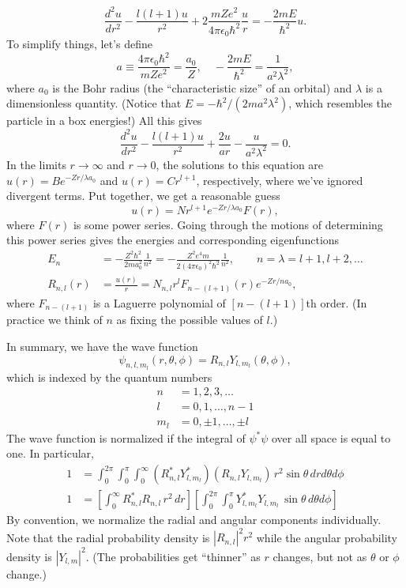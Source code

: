 \documentclass[../p052main.tex]{subfiles}
\begin{document}
\[ \frac{d^2u}{dr^2} - \frac{l(l+1)u}{r^2} + 2 \frac{mZe^2}{4\pi \epsilon_0 \hbar^2} \frac{u}{r} = -\frac{2mE}{\hbar^2}u .\]
To simplify things, let's define
\[ a \equiv \frac{4\pi \epsilon_0 \hbar^2}{mZe^2} = \frac{a_0}{Z}, \quad -\frac{2mE}{\hbar^2} = \frac{1}{a^2 \lambda^2}, \]
where $a_0$ is the Bohr radius (the ``characteristic size'' of an orbital) and $\lambda$ is a dimensionless quantity.
(Notice that $E = -\hbar^2 / (2ma^2 \lambda^2)$, which resembles the particle in a box energies!)
All this gives
\[ \frac{d^2 u}{dr^2} - \frac{l(l+1)u}{r^2} + \frac{2u}{ar} - \frac{u}{a^2 \lambda^2} = 0. \]
In the limits $r \to \infty$ and $r \to 0$, the solutions to this equation are $u(r) = Be^{-Zr / \lambda a_0}$ and $u(r) = Cr^{l+1}$, respectively, where we've ignored divergent terms.
Put together, we get a reasonable guess
\[ u(r) = N r^{l+1} e^{-Zr / \lambda a_0} F(r), \]
where $F(r)$ is some power series.
Going through the motions of determining this power series gives the energies and corresponding eigenfunctions
\begin{align*}
    E_n &= -\frac{Z^2 \hbar^2}{2m a_0^2} \frac{1}{n^2} = -\frac{Z^2 e^{4} m}{2(4 \pi \epsilon_0)^2 \hbar^2} \frac{1}{n^2}, \qquad n = \lambda = l+1, l+2, \ldots \\
    R_{n,l}(r) &= \frac{u(r)}{r} = N_{n,l} r^{l} F_{n-(l+1)}(r) e^{-Zr / na_0},
\end{align*}
where $F_{n-(l+1)}$ is a Laguerre polynomial of $[n-(l+1)]$th order.
(In practice we think of $n$ as fixing the possible values of $l$.)

In summary, we have the wave function
\[ \psi_{n,l,m_l}(r,\theta,\phi) = R_{n,l} Y_{l,m_l}(\theta, \phi), \]
which is indexed by the quantum numbers
\begin{align*}
    n &= 1, 2, 3, \ldots \\
    l &= 0, 1, \ldots, n-1 \\
    m_l &= 0, \pm 1, \ldots, \pm l
\end{align*}
The wave function is normalized if the integral of $\psi^* \psi$ over all space is equal to one.
In particular,
\begin{align*}
    1 &= \int_{0}^{2\pi} \int_{0}^{\pi} \int _{0}^{\infty} (R_{n,l}^* Y_{l,m_l}^*)(R_{n,l} Y_{l,m_l}) \,r^2 \sin\theta \,dr d\theta d\phi \\
    1 &= \left[ \int _{0}^{\infty} R_{n,l}^* R_{n,l} \,r^2 \,dr \right] \left[ \int_{0}^{2\pi} \int_{0}^{\pi} Y_{l,m_l}^* Y_{l,m_l} \,\sin\theta \,d\theta d\phi \right]
\end{align*}
By convention, we normalize the radial and angular components individually.
Note that the radial probability density is $|R_{n,l}|^2 r^2$ while the angular probability density is $|Y_{l,m}|^2$.
(The probabilities get ``thinner'' as $r$ changes, but not as $\theta$ or $\phi$ change.)
\end{document}
